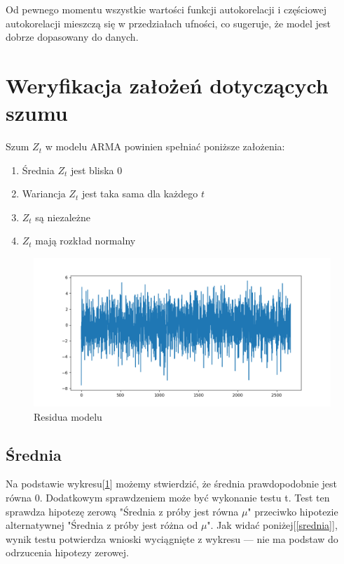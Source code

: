 \documentclass{article}
\theoremstyle{break}
\begin{document}
Od pewnego momentu wszystkie wartości funkcji autokorelacji i częściowej autokorelacji mieszczą się w przedziałach ufności, co sugeruje, że model jest dobrze dopasowany do danych.


\section{Weryfikacja założeń dotyczących szumu}

Szum ${Z_t}$ w modelu ARMA powinien spełniać poniższe założenia:
\begin{enumerate}
	\item Średnia ${Z_t}$ jest bliska 0
	\item Wariancja ${Z_t}$ jest taka sama dla każdego $t$
	\item ${Z_t}$ są niezależne
	\item ${Z_t}$ mają rozkład normalny
\end{enumerate}

\begin{figure}[H]
	\begin{center}
		\includegraphics[scale=0.63]{res.png}
		\caption{Residua modelu}
		\label{fig:res}
	\end{center}
\end{figure}

\subsection{Średnia}
Na podstawie wykresu[\ref{fig:res}] możemy stwierdzić, że średnia prawdopodobnie jest równa 0. Dodatkowym sprawdzeniem może być wykonanie testu t. Test ten sprawdza hipotezę zerową "Średnia z próby jest równa $\mu$" przeciwko hipotezie alternatywnej "Średnia z próby jest różna od $\mu$". Jak widać poniżej[\ref{srednia}], wynik testu potwierdza wnioski wyciągnięte z wykresu — nie ma podstaw do odrzucenia hipotezy zerowej.
\end{document}

